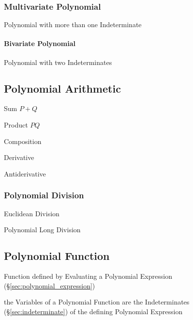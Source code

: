 \subsubsection{Multivariate Polynomial}\label{sec:multivariate_polynomial}

Polynomial with more than one Indeterminate



\paragraph{Bivariate Polynomial}\label{sec:bivariate_polynomial}\hfill

Polynomial with two Indeterminates



\subsection{Polynomial Arithmetic}\label{sec:polynomial_arithmetic}

Sum $P + Q$

Product $P Q$

Composition

Derivative

Antiderivative



\subsubsection{Polynomial Division}\label{sec:polynomial_division}

Euclidean Division

Polynomial Long Division



\subsection{Polynomial Function}\label{sec:polynomial_function}

Function defined by Evaluating a Polynomial Expression
(\S\ref{sec:polynomial_expression})

the Variables of a Polynomial Function are the Indeterminates
(\S\ref{sec:indeterminate}) of the defining Polynomial Expression

